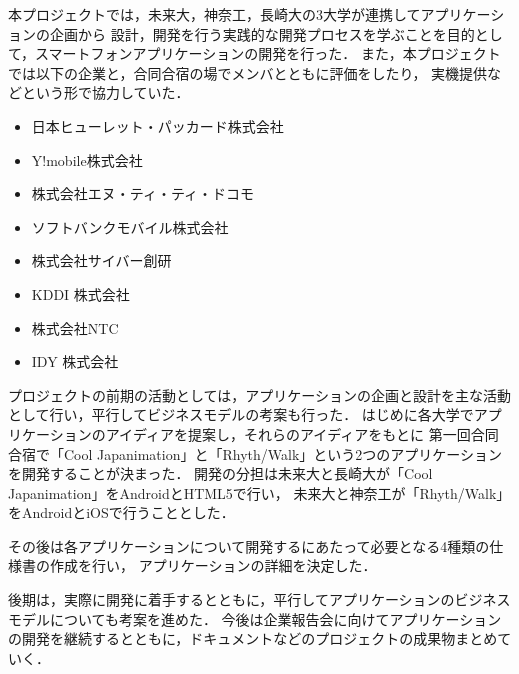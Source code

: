 \par
本プロジェクトでは，未来大，神奈工，長崎大の3大学が連携してアプリケーションの企画から
設計，開発を行う実践的な開発プロセスを学ぶことを目的として，スマートフォンアプリケーションの開発を行った．
また，本プロジェクトでは以下の企業と，合同合宿の場でメンバとともに評価をしたり，
実機提供などという形で協力していた．

\begin{itemize}
\item 日本ヒューレット・パッカード株式会社
\item Y!mobile株式会社
\item 株式会社エヌ・ティ・ティ・ドコモ
\item ソフトバンクモバイル株式会社
\item 株式会社サイバー創研
\item KDDI 株式会社
\item 株式会社NTC
\item IDY 株式会社
\end{itemize}

プロジェクトの前期の活動としては，アプリケーションの企画と設計を主な活動として行い，平行してビジネスモデルの考案も行った．
はじめに各大学でアプリケーションのアイディアを提案し，それらのアイディアをもとに
第一回合同合宿で「Cool Japanimation」と「Rhyth/Walk」という2つのアプリケーションを開発することが決まった．
開発の分担は未来大と長崎大が「Cool Japanimation」をAndroidとHTML5で行い，
未来大と神奈工が「Rhyth/Walk」をAndroidとiOSで行うこととした．

その後は各アプリケーションについて開発するにあたって必要となる4種類の仕様書の作成を行い，
アプリケーションの詳細を決定した．
\par
後期は，実際に開発に着手するとともに，平行してアプリケーションのビジネスモデルについても考案を進めた．
今後は企業報告会に向けてアプリケーションの開発を継続するとともに，ドキュメントなどのプロジェクトの成果物まとめていく．
